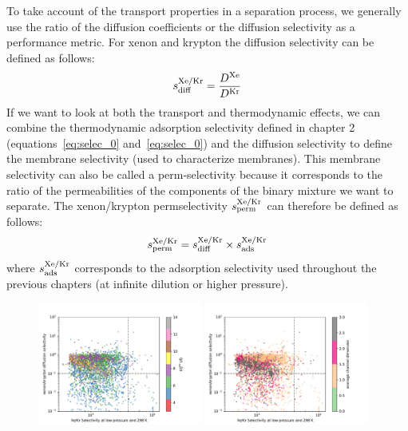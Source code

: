 \documentclass[main]{subfiles}
\begin{document}
To take account of the transport properties in a separation process, we generally use the ratio of the diffusion coefficients or the diffusion selectivity as a performance metric. For xenon and krypton the diffusion selectivity can be defined as follows:\autocite{Krishna_2010}
\begin{equation}
  s^{\text{Xe/Kr}}_{\text{diff}} = \frac{D^{\text{Xe}}}{D^{\text{Kr}}}
\end{equation}
If we want to look at both the transport and thermodynamic effects, we can combine the thermodynamic adsorption selectivity defined in chapter 2 (equations~\ref{eq:selec_0} and~\ref{eq:selec_0}) and the diffusion selectivity to define the membrane selectivity (used to characterize membranes). This membrane selectivity can also be called a perm-selectivity because it corresponds to the ratio of the permeabilities of the components of the binary mixture we want to separate. The xenon/krypton permselectivity $s^{\text{Xe/Kr}}_{\text{perm}}$ can therefore be defined as follows:
\begin{equation}
  s^{\text{Xe/Kr}}_{\text{perm}} = s^{\text{Xe/Kr}}_{\text{diff}} \times s^{\text{Xe/Kr}}_{\text{ads}}
\end{equation}
where $s^{\text{Xe/Kr}}_{\text{ads}}$ corresponds to the adsorption selectivity used throughout the previous chapters (at infinite dilution or higher pressure). 

\begin{figure}[ht]
  \centering
    \includegraphics[width=0.48\textwidth]{figures/5-diffusion/diff_D_xekr-s0-lcd.pdf}
    \includegraphics[width=0.48\textwidth]{figures/5-diffusion/diff_D_xekr-s0-chandim.pdf}
    \caption{}\label{fgr:perm_selec0}
\end{figure}
\end{document}
